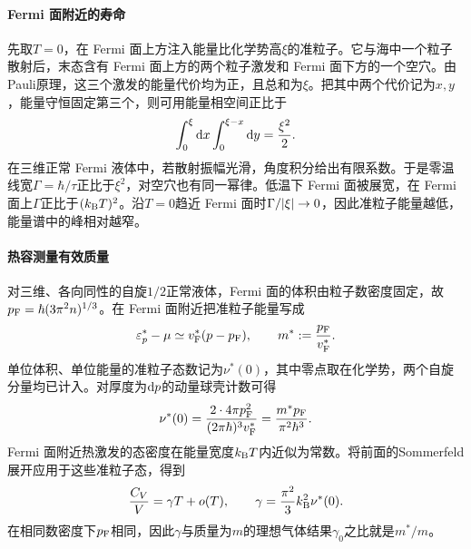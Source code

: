\paragraph{Fermi 面附近的寿命}
先取$T = 0$，在 Fermi 面上方注入能量比化学势高$\xi$的准粒子。它与海中一个粒子散射后，末态含有 Fermi 面上方的两个粒子激发和 Fermi 面下方的一个空穴。由Pauli原理，这三个激发的能量代价均为正，且总和为$\xi$。把其中两个代价记为$x,y$，能量守恒固定第三个，则可用能量相空间正比于
\[
	\int_0^\xi \mathop{}\!\mathrm{d} x\int_0^{\xi-x}\mathop{}\!\mathrm{d} y = \frac{\xi^2}{2}.
\]
在三维正常 Fermi 液体中，若散射振幅光滑，角度积分给出有限系数。于是零温线宽$\Gamma = \hbar/\tau$正比于$\xi^2$，对空穴也有同一幂律。低温下 Fermi 面被展宽，在 Fermi 面上$\Gamma$正比于$(k_{\mathrm{B}} T)^2$。沿$T = 0$趋近 Fermi 面时$\Gamma/\lvert\xi\rvert \to 0$，因此准粒子能量越低，能量谱中的峰相对越窄。

\paragraph{热容测量有效质量}
对三维、各向同性的自旋$1/2$正常液体，Fermi 面的体积由粒子数密度固定，故$p_\mathrm F = \hbar(3\pi^2 n)^{1/3}$。在 Fermi 面附近把准粒子能量写成
\begin{equation}
	\label{eq:sm-quasiparticle-effective-mass}
	\varepsilon_p^* - \mu \simeq v_\mathrm F^*(p - p_\mathrm F),\qquad
	m^* := \frac{p_\mathrm F}{v_\mathrm F^*}.
\end{equation}
单位体积、单位能量的准粒子态数记为$\nu^*(0)$，其中零点取在化学势，两个自旋分量均已计入。对厚度为$\mathop{}\!\mathrm{d} p$的动量球壳计数可得
\begin{equation}
	\label{eq:sm-quasiparticle-density-of-states}
	\nu^*(0) = \frac{2 \cdot 4\pi p_\mathrm F^2}{(2\pi\hbar)^3v_\mathrm F^*}
	= \frac{m^*p_\mathrm F}{\pi^2\hbar^3}.
\end{equation}
Fermi 面附近热激发的态密度在能量宽度$k_{\mathrm{B}} T$内近似为常数。将前面的Sommerfeld展开应用于这些准粒子态，得到
\begin{equation}
	\frac{C_V}{V} = \gamma T + o(T),\qquad
	\gamma = \frac{\pi^2}{3}k_{\mathrm{B}}^2\nu^*(0).
\end{equation}
在相同数密度下$p_\mathrm F$相同，因此$\gamma$与质量为$m$的理想气体结果$\gamma_0$之比就是$m^*/m$。

